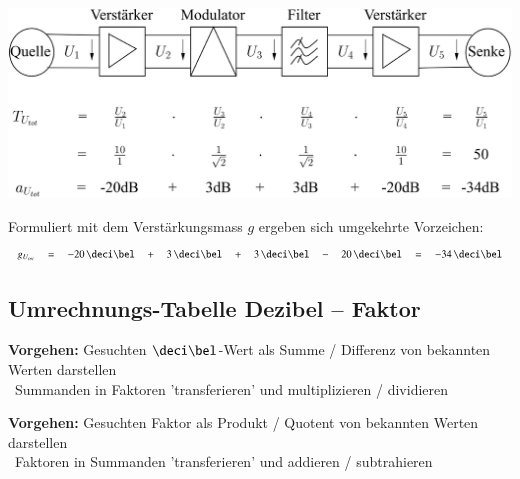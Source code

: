 
\includegraphics[width=0.9\columnwidth]{images/kaskadierung_verstaerkung_daempfung.png}

Formuliert mit dem Verstärkungsmass $g$ ergeben sich umgekehrte Vorzeichen:
$$ g_{U_{tot}} \quad = \quad - 20 \, \deci\bel \quad  + \quad 3 \, \deci\bel \quad + 
    \quad 3 \, \deci\bel \quad - \quad 20 \, \deci\bel \quad = \quad -34 \, \deci\bel $$



\subsection{Umrechnungs-Tabelle Dezibel -- Faktor}

\textbf{Vorgehen:} Gesuchten $\deci\bel$-Wert als Summe / Differenz von bekannten Werten darstellen\\
\textrightarrow\ Summanden in Faktoren 'transferieren' und multiplizieren / dividieren \medskip

\textbf{Vorgehen:} Gesuchten Faktor als Produkt / Quotent von bekannten Werten darstellen\\
\textrightarrow\ Faktoren in Summanden 'transferieren' und addieren / subtrahieren \medskip


